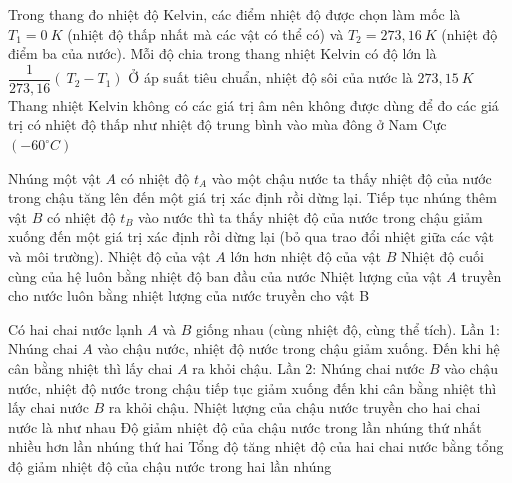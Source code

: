 \begin{ex} 
	Trong thang đo nhiệt độ Kelvin, các điểm nhiệt độ được chọn làm mốc là $T_1=0 \ K$ (nhiệt độ thấp nhất mà các vật có thể có) và $T_2=273,16 \ K$ (nhiệt độ điểm ba của nước).
	{\True Mỗi độ chia trong thang nhiệt Kelvin có độ lớn là $\dfrac{1}{273,16}\left(\ T_2-T_1\right)$}
	{Ở áp suất tiêu chuẩn, nhiệt độ sôi của nước là $273,15 \ K$}
	{Thang nhiệt Kelvin không có các giá trị âm nên không được dùng để đo các giá trị có nhiệt độ thấp như nhiệt độ trung bình vào mùa đông ở Nam Cực $\left(-60^\circ C\right)$}
\end{ex}
\begin{ex} 
	Nhúng một vật $A$ có nhiệt độ $t_A$ vào một chậu nước ta thấy nhiệt độ của nước trong chậu tăng lên đến một giá trị xác định rồi dừng lại. Tiếp tục nhúng thêm vật $B$ có nhiệt độ $t_{B}$ vào nước thì ta thấy nhiệt độ của nước trong chậu giảm xuống đến một giá trị xác định rồi dừng lại (bỏ qua trao đổi nhiệt giữa các vật và môi trường).
	{\True Nhiệt độ của vật $A$ lớn hơn nhiệt độ của vật $B$}
	{Nhiệt độ cuối cùng của hệ luôn bằng nhiệt độ ban đầu của nước}
	{Nhiệt lượng của vật $A$ truyền cho nước luôn bằng nhiệt lượng của nước truyền cho vật B}
\end{ex}

\begin{ex} 
	Có hai chai nước lạnh $A$ và $B$ giống nhau (cùng nhiệt độ, cùng thể tích). Lần 1: Nhúng chai $A$ vào chậu nước, nhiệt độ nước trong chậu giảm xuống. Đến khi hệ cân bằng nhiệt thì lấy chai $A$ ra khỏi chậu.
	Lần 2: Nhúng chai nước $B$ vào chậu nước, nhiệt độ nước trong chậu tiếp tục giảm xuống đến khi cân bằng nhiệt thì lấy chai nước $B$ ra khỏi chậu.
	{Nhiệt lượng của chậu nước truyền cho hai chai nước là như nhau}
	{\True Độ giảm nhiệt độ của chậu nước trong lần nhúng thứ nhất nhiều hơn lần nhúng thứ hai}
	{Tổng độ tăng nhiệt độ của hai chai nước bằng tổng độ giảm nhiệt độ của chậu nước trong hai lần nhúng}
\end{ex}
